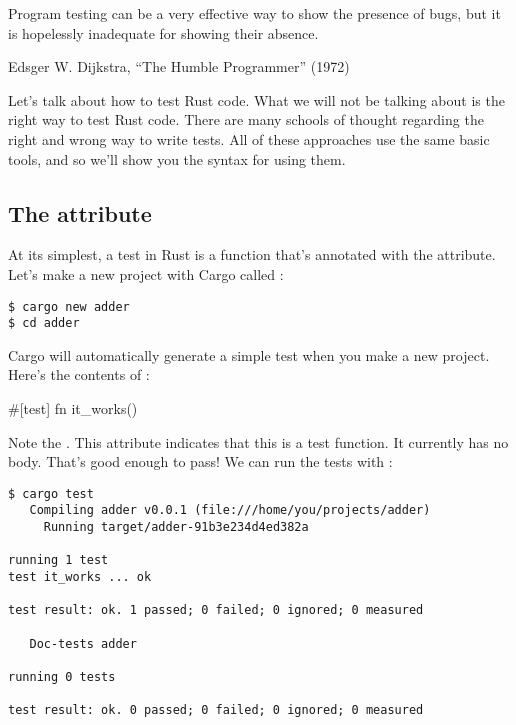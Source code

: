 
\begin{myquote}
Program testing can be a very effective way to show the presence of bugs, but it is hopelessly inadequate for showing their absence.

\blank

Edsger W. Dijkstra, \enquote{The Humble Programmer} (1972)
\end{myquote}

Let's talk about how to test Rust code. What we will not be talking about is the right way to test Rust code. There are many schools 
of thought regarding the right and wrong way to write tests. All of these approaches use the same basic tools, and so we'll show you 
the syntax for using them.

\subsection*{The  attribute}

At its simplest, a test in Rust is a function that's annotated with the  attribute. Let's make a new project with Cargo 
called :

\begin{verbatim}
$ cargo new adder
$ cd adder
\end{verbatim}

Cargo will automatically generate a simple test when you make a new project. Here's the contents of :

\begin{rustc}
#[test]
fn it_works() {
}
\end{rustc}

Note the \code{\#[test]}. This attribute indicates that this is a test function. It currently has no body. That's good enough to pass! 
We can run the tests with :

\begin{verbatim}
$ cargo test
   Compiling adder v0.0.1 (file:///home/you/projects/adder)
     Running target/adder-91b3e234d4ed382a

running 1 test
test it_works ... ok

test result: ok. 1 passed; 0 failed; 0 ignored; 0 measured

   Doc-tests adder

running 0 tests

test result: ok. 0 passed; 0 failed; 0 ignored; 0 measured
\end{verbatim}

